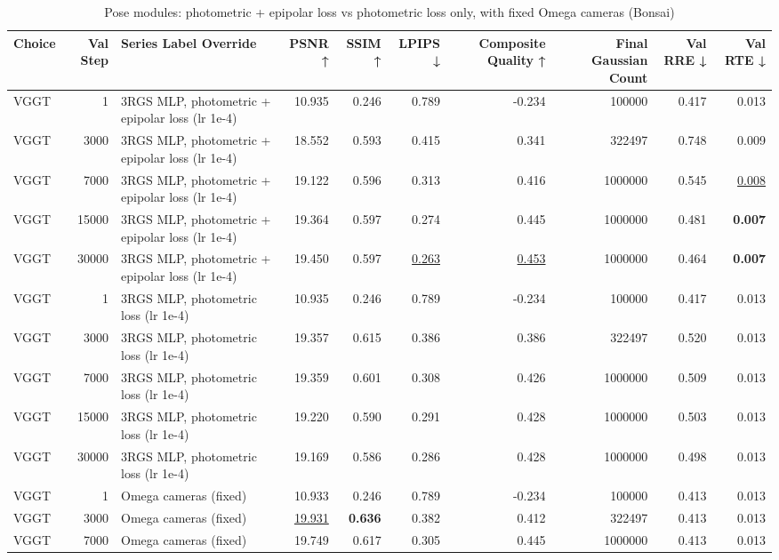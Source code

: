 \begin{table}[H]
\caption{\ifdefined\customcaption \customcaption \else Pose modules: photometric + epipolar loss vs photometric loss only, with fixed Omega cameras (Bonsai) \fi}
\label{tab:114_omega_epi_modules_bonsai}
\centering
\tiny
\begin{tabular}{lrlrrrrrrr}
\toprule
Choice & Val Step & Series Label Override & PSNR ↑ & SSIM ↑ & LPIPS ↓ & Composite Quality ↑ & Final Gaussian Count & Val RRE ↓ & Val RTE ↓ \\
\midrule
VGGT & 1 & 3RGS MLP, photometric + epipolar loss (lr 1e-4) & 10.935 & 0.246 & 0.789 & -0.234 & 100000 & 0.417 & 0.013 \\
VGGT & 3000 & 3RGS MLP, photometric + epipolar loss (lr 1e-4) & 18.552 & 0.593 & 0.415 & 0.341 & 322497 & 0.748 & 0.009 \\
VGGT & 7000 & 3RGS MLP, photometric + epipolar loss (lr 1e-4) & 19.122 & 0.596 & 0.313 & 0.416 & 1000000 & 0.545 & \underline{0.008} \\
VGGT & 15000 & 3RGS MLP, photometric + epipolar loss (lr 1e-4) & 19.364 & 0.597 & 0.274 & 0.445 & 1000000 & 0.481 & \textbf{0.007} \\
VGGT & 30000 & 3RGS MLP, photometric + epipolar loss (lr 1e-4) & 19.450 & 0.597 & \underline{0.263} & \underline{0.453} & 1000000 & 0.464 & \textbf{0.007} \\
VGGT & 1 & 3RGS MLP, photometric loss (lr 1e-4) & 10.935 & 0.246 & 0.789 & -0.234 & 100000 & 0.417 & 0.013 \\
VGGT & 3000 & 3RGS MLP, photometric loss (lr 1e-4) & 19.357 & 0.615 & 0.386 & 0.386 & 322497 & 0.520 & 0.013 \\
VGGT & 7000 & 3RGS MLP, photometric loss (lr 1e-4) & 19.359 & 0.601 & 0.308 & 0.426 & 1000000 & 0.509 & 0.013 \\
VGGT & 15000 & 3RGS MLP, photometric loss (lr 1e-4) & 19.220 & 0.590 & 0.291 & 0.428 & 1000000 & 0.503 & 0.013 \\
VGGT & 30000 & 3RGS MLP, photometric loss (lr 1e-4) & 19.169 & 0.586 & 0.286 & 0.428 & 1000000 & 0.498 & 0.013 \\
VGGT & 1 & Omega cameras (fixed) & 10.933 & 0.246 & 0.789 & -0.234 & 100000 & 0.413 & 0.013 \\
VGGT & 3000 & Omega cameras (fixed) & \underline{19.931} & \textbf{0.636} & 0.382 & 0.412 & 322497 & 0.413 & 0.013 \\
VGGT & 7000 & Omega cameras (fixed) & 19.749 & 0.617 & 0.305 & 0.445 & 1000000 & 0.413 & 0.013 \\

\end{tabular}
\end{table}
